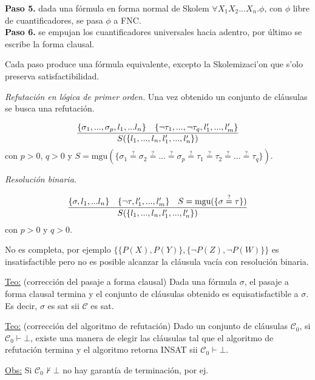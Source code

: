 \documentclass[12pt]{extarticle}
\def\teorema{\underline{Teo:} }
\def\observacion{\underline{Obs:} }
\def\equ{\overset{?}{=}}
\def\ssspace{\space\space\space}
\begin{document}
\textbf{Paso 5.} dada una fórmula en forma normal de Skolem $\forall\!X_1X_2...X_n.\phi$, con $\phi$ libre de cuantificadores, se pasa $\phi$ a FNC. \\
\textbf{Paso 6.} se empujan los cuantificadores universales hacia adentro, por último se escribe la forma clausal.

Cada paso produce una fórmula equivalente, excepto la Skolemizaci'on que s'olo preserva satisfactibilidad.

\textit{Refutación en lógica de primer orden.} 
Una vez obtenido un conjunto de cláusulas se busca una refutación.

$$\frac{\{\sigma_1,...,\sigma_p,l_1,...l_n\} \text{\ssspace} \{\neg\tau_1,...,\neg\tau_q,l'_1,...,l'_m\} }{S(\{l_1,...,l_n,l'_1,...,l'_n\})}$$
con $p > 0$, $q > 0$ y $S=\text{mgu}(\{\sigma_1\equ\sigma_2\equ...\equ\sigma_p\equ\tau_1\equ\tau_2\equ...\equ\tau_q\})$.

\textit{Resolución binaria.} 

$$\frac{\{\sigma,l_1,...l_n\} \text{\ssspace} \{\neg\tau,l'_1,...,l'_m\} \text{\ssspace} S=\text{mgu}(\{\sigma\equ\tau\})}{S(\{l_1,...,l_n,l'_1,...,l'_n\})}$$
con $p > 0$ y $q > 0$.

No es completa, por ejemplo $\{\{P(X),P(Y)\},\{\neg P(Z), \neg P(W)\}\}$ es insatisfactible pero no es posible alcanzar la cláusula vacía con resolución binaria.

\teorema (corrección del pasaje a forma clausal)
Dada una fórmula $\sigma$, el pasaje a forma clausal termina y el conjunto de cláusulas obtenido es equisatisfactible a $\sigma$. Es decir, $\sigma$ es sat sii $\mathcal{C}$ es sat.

\teorema (corrección del algoritmo de refutación)
Dado un conjunto de cláusulas $\mathcal{C}_0$, si $\mathcal{C}_0\vdash\bot$, existe una manera de elegir las cláusulas tal que el algoritmo de refutación termina y el algoritmo retorna INSAT sii $\mathcal{C}_0\vdash\bot$.

\observacion Si $\mathcal{C}_0\not\vdash\bot$ no hay garantía de terminación, por ej.
\end{document}
